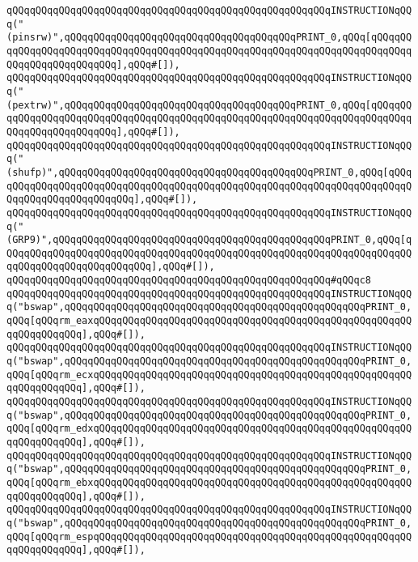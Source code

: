 \verb|qQQqqQQqqQQqqQQqqQQqqQQqqQQqqQQqqQQqqQQqqQQqqQQqqQQqqQQqINSTRUCTIONqQQq("(pinsrw)",qQQqqQQqqQQqqQQqqQQqqQQqqQQqqQQqqQQqqQQqPRINT_0,qQQq[qQQqqQQqqQQqqQQqqQQqqQQqqQQqqQQqqQQqqQQqqQQqqQQqqQQqqQQqqQQqqQQqqQQqqQQqqQQqqQQqqQQqqQQqqQQqqQQq],qQQq#[]),|\newline
\verb|qQQqqQQqqQQqqQQqqQQqqQQqqQQqqQQqqQQqqQQqqQQqqQQqqQQqqQQqINSTRUCTIONqQQq("(pextrw)",qQQqqQQqqQQqqQQqqQQqqQQqqQQqqQQqqQQqqQQqPRINT_0,qQQq[qQQqqQQqqQQqqQQqqQQqqQQqqQQqqQQqqQQqqQQqqQQqqQQqqQQqqQQqqQQqqQQqqQQqqQQqqQQqqQQqqQQqqQQqqQQqqQQq],qQQq#[]),|\newline
\verb|qQQqqQQqqQQqqQQqqQQqqQQqqQQqqQQqqQQqqQQqqQQqqQQqqQQqqQQqINSTRUCTIONqQQq("(shufp)",qQQqqQQqqQQqqQQqqQQqqQQqqQQqqQQqqQQqqQQqqQQqPRINT_0,qQQq[qQQqqQQqqQQqqQQqqQQqqQQqqQQqqQQqqQQqqQQqqQQqqQQqqQQqqQQqqQQqqQQqqQQqqQQqqQQqqQQqqQQqqQQqqQQqqQQq],qQQq#[]),|\newline
\verb|qQQqqQQqqQQqqQQqqQQqqQQqqQQqqQQqqQQqqQQqqQQqqQQqqQQqqQQqINSTRUCTIONqQQq("(GRP9)",qQQqqQQqqQQqqQQqqQQqqQQqqQQqqQQqqQQqqQQqqQQqqQQqPRINT_0,qQQq[qQQqqQQqqQQqqQQqqQQqqQQqqQQqqQQqqQQqqQQqqQQqqQQqqQQqqQQqqQQqqQQqqQQqqQQqqQQqqQQqqQQqqQQqqQQqqQQq],qQQq#[]),|\newline
\verb|qQQqqQQqqQQqqQQqqQQqqQQqqQQqqQQqqQQqqQQqqQQqqQQqqQQqqQQq#qQQqc8|\newline
\verb|qQQqqQQqqQQqqQQqqQQqqQQqqQQqqQQqqQQqqQQqqQQqqQQqqQQqqQQqINSTRUCTIONqQQq("bswap",qQQqqQQqqQQqqQQqqQQqqQQqqQQqqQQqqQQqqQQqqQQqqQQqqQQqPRINT_0,qQQq[qQQqrm_eaxqQQqqQQqqQQqqQQqqQQqqQQqqQQqqQQqqQQqqQQqqQQqqQQqqQQqqQQqqQQqqQQqqQQq],qQQq#[]),|\newline
\verb|qQQqqQQqqQQqqQQqqQQqqQQqqQQqqQQqqQQqqQQqqQQqqQQqqQQqqQQqINSTRUCTIONqQQq("bswap",qQQqqQQqqQQqqQQqqQQqqQQqqQQqqQQqqQQqqQQqqQQqqQQqqQQqPRINT_0,qQQq[qQQqrm_ecxqQQqqQQqqQQqqQQqqQQqqQQqqQQqqQQqqQQqqQQqqQQqqQQqqQQqqQQqqQQqqQQqqQQq],qQQq#[]),|\newline
\verb|qQQqqQQqqQQqqQQqqQQqqQQqqQQqqQQqqQQqqQQqqQQqqQQqqQQqqQQqINSTRUCTIONqQQq("bswap",qQQqqQQqqQQqqQQqqQQqqQQqqQQqqQQqqQQqqQQqqQQqqQQqqQQqPRINT_0,qQQq[qQQqrm_edxqQQqqQQqqQQqqQQqqQQqqQQqqQQqqQQqqQQqqQQqqQQqqQQqqQQqqQQqqQQqqQQqqQQq],qQQq#[]),|\newline
\verb|qQQqqQQqqQQqqQQqqQQqqQQqqQQqqQQqqQQqqQQqqQQqqQQqqQQqqQQqINSTRUCTIONqQQq("bswap",qQQqqQQqqQQqqQQqqQQqqQQqqQQqqQQqqQQqqQQqqQQqqQQqqQQqPRINT_0,qQQq[qQQqrm_ebxqQQqqQQqqQQqqQQqqQQqqQQqqQQqqQQqqQQqqQQqqQQqqQQqqQQqqQQqqQQqqQQqqQQq],qQQq#[]),|\newline
\verb|qQQqqQQqqQQqqQQqqQQqqQQqqQQqqQQqqQQqqQQqqQQqqQQqqQQqqQQqINSTRUCTIONqQQq("bswap",qQQqqQQqqQQqqQQqqQQqqQQqqQQqqQQqqQQqqQQqqQQqqQQqqQQqPRINT_0,qQQq[qQQqrm_espqQQqqQQqqQQqqQQqqQQqqQQqqQQqqQQqqQQqqQQqqQQqqQQqqQQqqQQqqQQqqQQqqQQq],qQQq#[]),|\newline
